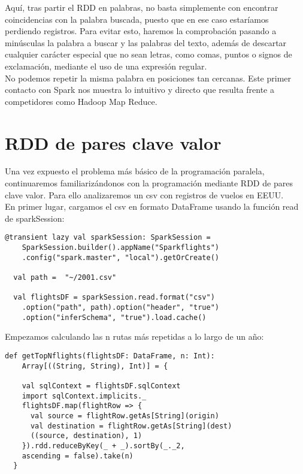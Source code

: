 Aquí, tras partir el RDD en palabras, no basta simplemente con encontrar coincidencias con la palabra buscada, puesto que en ese caso estaríamos perdiendo registros. Para evitar esto, haremos la comprobación pasando a minúsculas la palabra a buscar y las palabras del texto, además de descartar cualquier carácter especial que no sean letras, como comas, puntos o signos de exclamación, mediante el uso de una expresión regular.\\
     
No podemos repetir la misma palabra en posiciones tan cercanas. Este primer contacto con Spark nos muestra lo intuitivo y directo que resulta frente a competidores como Hadoop Map Reduce.\\

\section{RDD de pares clave valor}

Una vez expuesto el problema más básico de la programación paralela, continuaremos familiarizándonos con la programación mediante RDD de pares clave valor. Para ello analizaremos un csv con registros de vuelos en EEUU.\\ 

En primer lugar, cargamos el csv en formato DataFrame usando la función read de sparkSession: \\

\begin{lstlisting}[frame=single]
  @transient lazy val sparkSession: SparkSession =
    SparkSession.builder().appName("Sparkflights")
    .config("spark.master", "local").getOrCreate()
    
  val path =  "~/2001.csv"
  
  val flightsDF = sparkSession.read.format("csv")
  	.option("path", path).option("header", "true")
  	.option("inferSchema", "true").load.cache()
\end{lstlisting}

Empezamos calculando las n rutas más repetidas a lo largo de un año:\\

\begin{lstlisting}[frame=single]
  def getTopNflights(flightsDF: DataFrame, n: Int): 
  	Array[((String, String), Int)] = {
  	
    val sqlContext = flightsDF.sqlContext
    import sqlContext.implicits._
    flightsDF.map(flightRow => {
      val source = flightRow.getAs[String](origin)
      val destination = flightRow.getAs[String](dest)
      ((source, destination), 1)
    }).rdd.reduceByKey(_ + _).sortBy(_._2, 
    ascending = false).take(n)
  }
\end{lstlisting}

